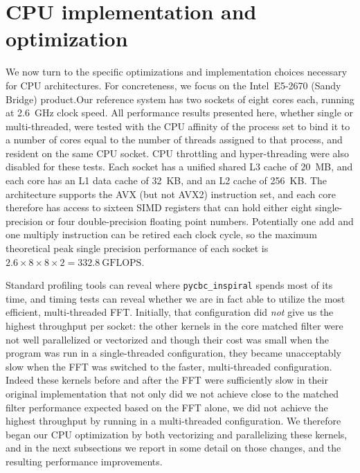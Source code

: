 \vspace*{-10pt}
\section{CPU implementation and optimization}\label{sec:cpu-opt}
\vspace*{-05pt}

We now turn to the specific optimizations and implementation choices necessary
for CPU architectures.  For concreteness, we focus on the
Intel\textsuperscript{\textregistered}~E5-2670 (Sandy Bridge) product.Our reference system
has two sockets of eight cores each, running at 2.6~GHz clock speed. 
All performance results presented here, whether single or multi-threaded, were
tested with the CPU affinity of the process set to bind it to a number of cores
equal to the number of threads assigned to that process, and resident on the
same CPU socket.  CPU throttling and hyper-threading were also disabled for
these tests.
 Each
socket has a unified shared L3 cache of 20~MB, and each core has an L1 data
cache of 32~KB, and an L2 cache of 256~KB. The architecture supports the AVX
(but not AVX2) instruction set, and each core therefore has access to sixteen
SIMD registers that can hold either eight single-precision or four
double-precision floating point numbers. Potentially one add and one multiply
instruction can be retired each clock cycle, so the maximum theoretical peak
single precision performance of each socket is $2.6\times 8\times 8\times 2 =
332.8~\mathrm{GFLOPS}$. 

Standard profiling tools can reveal where \texttt{pycbc\_inspiral} spends most of
its time, and timing tests can reveal whether we are in fact able to utilize the
most efficient, multi-threaded FFT.  Initially, that configuration did
\emph{not} give us the highest throughput per socket: the other kernels in the
core matched filter were not well parallelized or vectorized and though their
cost was small when the program was run in a single-threaded configuration, they
became unacceptably slow when the FFT was switched to the faster, multi-threaded
configuration. Indeed these kernels before and after the FFT were sufficiently
slow in their original implementation that not only did we not achieve close to
the matched filter performance expected based on the FFT alone, we did not
achieve the highest throughput by running in a multi-threaded
configuration. We therefore began our CPU optimization by both vectorizing and
parallelizing these kernels, and in the next subsections we report in some
detail on those changes, and the resulting performance improvements.

